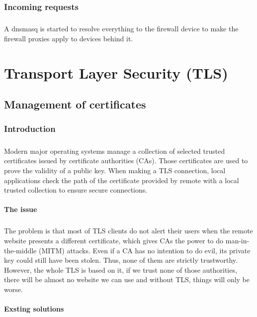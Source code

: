 \documentclass[mscthesis]{usiinfthesis}
\begin{document}
\subsection{Incoming requests}
\paragraph{}
A dnsmasq is started to resolve everything to the firewall device to make the firewall proxies apply to devices behind it.

\chapter{Transport Layer Security (TLS)}

\section{Management of certificates}

\subsection{Introduction}
\paragraph{}
Modern major operating systems manage a collection of selected trusted certificates issued by certificate authorities (CAs). Those certificates are used to prove the validity of a public key. When making a TLS connection, local applications check the path of the certificate provided by remote with a local trusted collection to ensure secure connections.
\subsubsection{The issue}
\paragraph{}
The problem is that most of TLS clients do not alert their users when the remote website presents a different certificate, which gives CAs the power to do man-in-the-middle (MITM) attacks. Even if a CA has no intention to do evil, its private key could still have been stolen. Thus, none of them are strictly trustworthy. However, the whole TLS is based on it, if we trust none of those authorities, there will be almost no website we can use and without TLS, things will only be worse.
\subsubsection{Exsting solutions}
\end{document}
